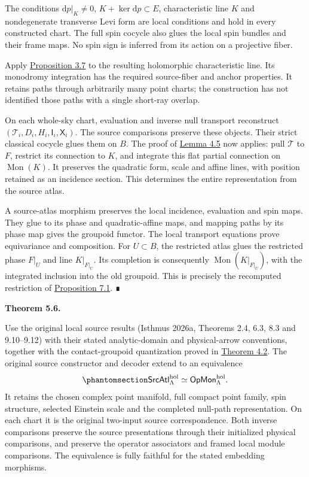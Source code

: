 \documentclass[
  english,
  11pt,
  reqno]{amsart}
\makeatletter
\newcommand{\pandocstatementheading}[1]{%
  \par\addpenalty{\@beginparpenalty}%
  \addvspace{.5\baselineskip plus .2\baselineskip minus .2\baselineskip}%
  {\normalfont\bfseries #1\par}%
  \nobreak\@afterindenttrue\@afterheading
}
\makeatother
\begin{document}
The conditions \(\mathrm dp|_K\ne0\), \(K+\ker\mathrm dp\subset E\),
characteristic line \(K\) and nondegenerate transverse Levi form are
local conditions and hold in every constructed chart. The full spin
cocycle also glues the local spin bundles and their frame maps. No spin
sign is inferred from its action on a projective fiber.

Apply \hyperref[prop:holomorphic-null-monodromy]{Proposition 3.7} to the
resulting holomorphic characteristic line. Its monodromy integration has
the required source-fiber and anchor properties. It retains paths
through arbitrarily many point charts; the construction has not
identified those paths with a single short-ray overlap.

On each whole-sky chart, evaluation and inverse null transport
reconstruct \((\mathcal T_i,D_i,H_i,\mathsf I_i,\mathsf X_i)\). The
source comparisons preserve these objects. Their strict classical
cocycle glues them on \(B\). The proof of
\hyperref[lem:operator-atlas-quadratic-completion]{Lemma 4.5} now
applies: pull \(\mathcal T\) to \(F\), restrict its connection to \(K\),
and integrate this flat partial connection on \(\operatorname{Mon}(K)\).
It preserves the quadratic form, scale and affine lines, with position
retained as an incidence section. This determines the entire
representation from the source atlas.

A source-atlas morphism preserves the local incidence, evaluation and
spin maps. They glue to its phase and quadratic-affine maps, and mapping
paths by its phase map gives the groupoid functor. The local transport
equations prove equivariance and composition. For \(U\subset B\), the
restricted atlas glues the restricted phase \(F|_U\) and line
\(K|_{F|_U}\). Its completion is consequently
\(\operatorname{Mon}(K|_{F|_U})\), with the integrated inclusion into
the old groupoid. This is precisely the recomputed restriction of
\hyperref[prop:recomputed-monodromy-restriction]{Proposition 7.1}. ∎

\pandocstatementheading{\protect{}\label{thm:original-source-atlas-operator-equivalence}Theorem 5.6.}

Use the original local source results (Isthmus 2026a, Theorems 2.4, 6.3,
8.3 and 9.10--9.12) with their stated analytic-domain and physical-arrow
conventions, together with the contact-groupoid quantization proved in
\hyperref[thm:contact-groupoid-structured-quantization]{Theorem 4.2}.
The original source constructor and decoder extend to an equivalence
\begin{equation}\protect\phantomsection\label{eq:original-source-atlas-operator-equivalence}{
\mathsf{SrcAtl}^{\mathrm{hol}}_\Lambda
\simeq
\mathsf{OpMon}^{\mathrm{hol}}_\Lambda.
}\end{equation} It retains the chosen complex point manifold, full
compact point family, spin structure, selected Einstein scale and the
completed null-path representation. On each chart it is the original
two-input source correspondence. Both inverse comparisons preserve the
source presentations through their initialized physical comparisons, and
preserve the operator associators and framed local module comparisons.
The equivalence is fully faithful for the stated embedding morphisms.
\end{document}
